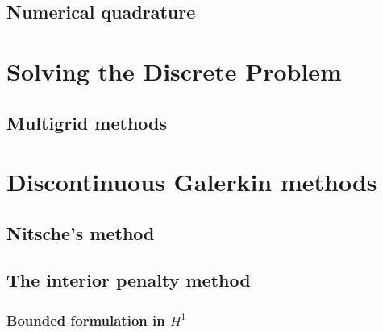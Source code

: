 \section{Numerical quadrature}


\chapter{Solving the Discrete Problem}




\section{Multigrid methods}


\chapter{Discontinuous Galerkin methods}
\section{Nitsche's method}
\label{sec:nitsches-method}


\section{The interior penalty method}
\label{sec:interior-penalty}

\subsection{Bounded formulation in $H^1$}




\printindex

